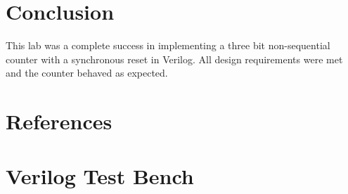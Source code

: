 \documentclass[12pt]{article}
\begin{document}

\section{Conclusion}

This lab was a complete success in implementing a three bit non-sequential
counter with a synchronous reset in Verilog.
All design requirements were met and the counter behaved as
expected.



\renewcommand*{\refname}{\vspace{-8mm}}
\section{References}



\appendix

\clearpage
\section{Verilog Test Bench}
\label{sec:test}


\end{document}
